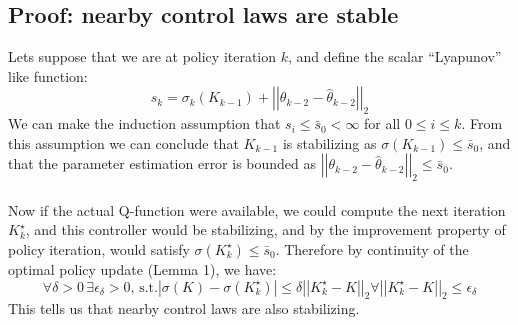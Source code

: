 \documentclass{article}[12pt]
\newcommand{\twonorm}[1]{\left|\left|#1\right|\right|_2}
\begin{document}
\subsection{Proof: nearby control laws are stable}
Lets suppose that we are at policy iteration $k$, and define the scalar ``Lyapunov'' like function:
\begin{equation}\label{eq:20}
s_k = \sigma_k(K_{k-1}) + \twonorm{\theta_{k-2}-\hat{\theta}_{k-2}}
\end{equation}
We can make the induction assumption that $s_i \leq \bar{s}_0<\infty$ for all $0\leq i \leq k$. From this assumption we can conclude that $K_{k-1}$ is stabilizing as $\sigma(K_{k-1})\leq \bar{s}_0$, and that the parameter estimation error is bounded as $\twonorm{\theta_{k-2}-\hat{\theta}_{k-2}}\leq \bar{s}_0$. \\ \\ 
Now if the actual Q-function were available, we could compute the next iteration $K^\star_k$, and this controller would be stabilizing, and by the improvement property of policy iteration, would satisfy $\sigma(K^\star_k) \leq \bar{s}_0$. Therefore by continuity of the optimal policy update (Lemma 1), we have:
\begin{equation}\label{eq:21}
\forall \delta >0 \, \exists \epsilon_\delta >0
\text{, s.t.} |\sigma(K)-\sigma(K_k^\star)|\leq \delta\twonorm{K^\star_k-K} \forall \twonorm{K^\star_k-K}\leq \epsilon_\delta
\end{equation}
This tells us that nearby control laws are also stabilizing.
\end{document}
